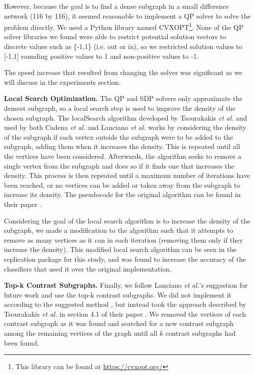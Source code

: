 \documentclass[sigconf]{acmart}
\begin{document}
However, because the goal is to find a dense subgraph in a small difference network (116 by 116), it seemed reasonable to implement a QP solver to solve the problem directly.
We used a Python library named CVXOPT\footnote{This library can be found at \url{https://cvxopt.org/}}.
None of the QP solver libraries we found were able to restrict potential solution vectors to discrete values such as \{-1,1\} (i.e. out or in), so we restricted solution values to [-1,1] rounding positive values to 1 and non-positive values to -1.

The speed increase that resulted from changing the solver was significant as we will discuss in the experiments section.

\textbf{Local Search Optimization.}
The QP and SDP solvers only approximate the densest subgraph, so a local search step is used to improve the density of the chosen subgraph.
The localSearch algorithm developed by Tsourakakis \emph{et al.} and used by both Cadena \emph{et al.} and Lanciano \emph{et al.} works by considering the density of the subgraph if each vertex outside the subgraph were to be added to the subgraph, adding them when it increases the density.
This is repeated until all the vertices have been considered.
Afterwards, the algorithm seeks to remove a single vertex from the subgraph and does so if it finds one that increases the density.
This process is then repeated until a maximum number of iterations have been reached, or no vertices can be added or taken away from the subgraph to increase its density.
The pseudocode for the original algorithm can be found in their paper \cite{tsourakakis2013}.

Considering the goal of the local search algorithm is to increase the density of the subgraph, we made a modification to the algorithm such that it attempts to remove as many vertices as it can in each iteration (removing them only if they increase the density).
This modified local search algorithm can be seen in the replication package for this study, and was found to increase the accuracy of the classifiers that used it over the original implementation.

\textbf{Top-k Contrast Subgraphs.}
Finally, we follow Lanciano \emph{et al.}'s suggestion for future work and use the top-k contrast subgraphs.
We did not implement it according to the suggested method \cite{balalau2015}, but instead took the approach described by Tsourakakis \emph{et al.} in section 4.1 of their paper \cite{tsourakakis2013}.
We removed the vertices of each contrast subgraph as it was found and searched for a new contrast subgraph among the remaining vertices of the graph until all $k$ contrast subgraphs had been found.
\end{document}
